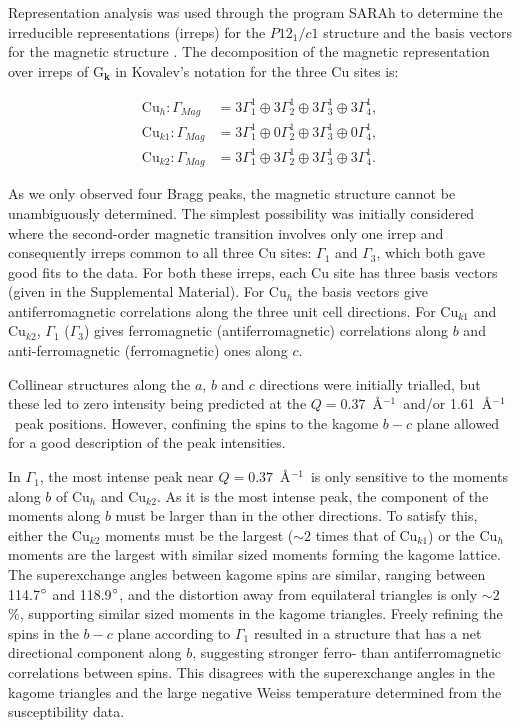 \documentclass[
sn-nature,
Numbered,
iicol]
{sn-jnl}%
\newcommand{\Ang}{\AA$^{-1}$}
\begin{document}
Representation analysis was used through the program SARAh to determine the irreducible representations (irreps) for the $P12_1/c1$ structure and the basis vectors for the magnetic structure \cite{Wills2000ASARAh}. The decomposition of the magnetic representation over irreps of G$_\textbf{k}$ in Kovalev's notation \cite{Kovalev1993} for the three Cu sites is:

\begin{align}
    \mathrm{Cu}_h: \Gamma_{Mag} &= 3 \Gamma^1 _1 \oplus 3 \Gamma^1 _2 \oplus  3 \Gamma^1 _3 \oplus  3 \Gamma^1 _4, \\
    \mathrm{Cu}_{k1}: \Gamma_{Mag} &= 3 \Gamma^1 _1 \oplus  0 \Gamma^1 _2 \oplus  3 \Gamma^1 _3 \oplus  0 \Gamma^1 _4, \\
    \mathrm{Cu}_{k2}: \Gamma_{Mag} &= 3 \Gamma^1 _1 \oplus  3 \Gamma^1 _2 \oplus  3 \Gamma^1 _3 \oplus  3 \Gamma^1 _4.
\end{align}

As we only observed four Bragg peaks, the magnetic structure cannot be unambiguously determined. The simplest possibility was initially considered where the second-order magnetic transition involves only one irrep and consequently irreps common to all three Cu sites: $\Gamma_1$ and $\Gamma_3$, which both gave good fits to the data. For both these irreps, each Cu site has three basis vectors (given in the Supplemental Material). For Cu$_h$ the basis vectors give antiferromagnetic correlations along the three unit cell directions. For Cu$_{k1}$ and Cu$_{k2}$, $\Gamma_1$ ($\Gamma_3$) gives ferromagnetic (antiferromagnetic) correlations along $b$ and anti-ferromagnetic (ferromagnetic) ones along $c$.

Collinear structures along the $a$, $b$ and $c$ directions were initially trialled, but these led to zero intensity being predicted at the $Q=0.37$~\Ang\ and/or 1.61~\Ang\ peak positions. 
However, confining the spins to the kagome $b-c$ plane allowed for a good description of the peak intensities.

In $\Gamma_1$, the most intense peak near $Q=0.37$~\Ang\ is only sensitive to the moments along $b$ of Cu$_h$ and Cu$_{k2}$.
 As it is the most intense peak, the component of the moments along $b$ must be larger than in the other directions. 
 To satisfy this, either the Cu$_{k2}$ moments must be the largest ($\sim2$ times that of Cu$_{k1}$) or the Cu$_h$ moments are the largest with similar sized moments forming the kagome lattice. 
 The superexchange angles between kagome spins are similar, ranging between 114.7$\degree$ and 118.9$\degree$, and the distortion away from equilateral triangles is only $\sim2$\%, supporting similar sized moments in the kagome triangles. 
Freely refining the spins in the $b-c$ plane according to $\Gamma_1$ resulted in a structure that has a net directional component along $b$, suggesting stronger ferro- than antiferromagnetic correlations between spins. 
This disagrees with the superexchange angles in the kagome triangles and the large negative Weiss temperature determined from the susceptibility data.
\end{document}
